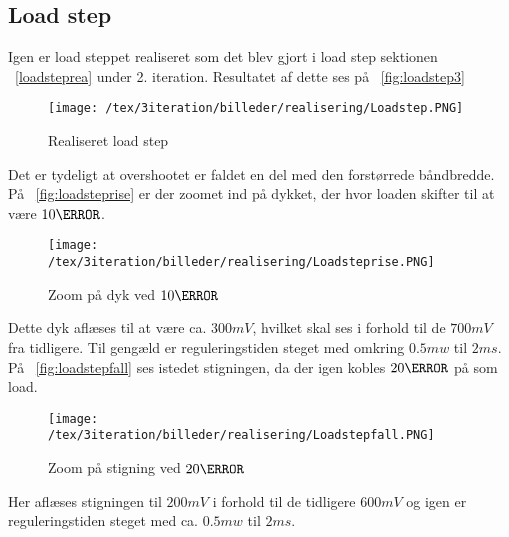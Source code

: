 \subsection{Load step}
Igen er load steppet realiseret som det blev gjort i load step sektionen ~\ref{loadsteprea} under 2. iteration. Resultatet af dette ses på ~\ref{fig:loadstep3}
\begin{figure}[H]
	\center
	\texttt{[image: /tex/3iteration/billeder/realisering/Loadstep.PNG]}
	\caption{Realiseret load step}
	\label{fig:Loadstep3}
\end{figure} 
Det er tydeligt at overshootet er faldet en del med den forstørrede båndbredde. På ~\ref{fig:loadsteprise} er der zoomet ind på dykket, der hvor loaden skifter til at være $10\ohm$.
\begin{figure}[H]
	\center
	\texttt{[image: /tex/3iteration/billeder/realisering/Loadsteprise.PNG]}
	\caption{Zoom på dyk ved $10\ohm$}
	\label{fig:Loadsteprise}
\end{figure}
Dette dyk aflæses til at være ca. $300mV$, hvilket skal ses i forhold til de $700mV$ fra tidligere. Til gengæld er reguleringstiden steget med omkring $0.5mw$ til $2ms$. På ~\ref{fig:loadstepfall} ses istedet stigningen, da der igen kobles $20\ohm$ på som load.
\begin{figure}[H]
	\center
	\texttt{[image: /tex/3iteration/billeder/realisering/Loadstepfall.PNG]}
	\caption{Zoom på stigning ved $20\ohm$}
	\label{fig:Loadstepfall}
\end{figure}
Her aflæses stigningen til $200mV$ i forhold til de tidligere $600mV$ og igen er reguleringstiden steget med ca. $0.5mw$ til $2ms$. 
